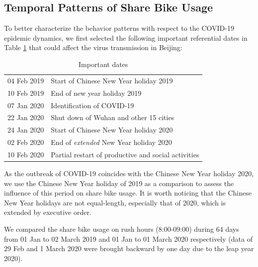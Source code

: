 \documentclass[ijgi,submit,moreauthors,pdftex]{Definitions/mdpi}
\begin{document}
\subsection{Temporal Patterns of Share Bike Usage}
To better characterize the behavior patterns with respect to the COVID-19 epidemic dynamics, we first selected the following important referential dates in Table \ref{tab:important_dates} that could affect the virus transmission in Beijing: 

\begin{table}[ht]
    \centering
    \begin{tabular}{ll}
    04 Feb 2019 & Start of Chinese New Year holiday 2019\\
    10 Feb 2019 & End of new year holiday 2019\\
    07 Jan 2020 & Identification of COVID-19\\
    22 Jan 2020 & Shut down of Wuhan and other 15 cities\\
    24 Jan 2020 & Start of Chinese New Year holiday 2020\\
    02 Feb 2020 & End of \textit{extended} New Year holiday 2020\\
    10 Feb 2020 & Partial restart of productive and social activities
    \end{tabular}
    \caption{Important dates}
    \label{tab:important_dates}
\end{table}

As the outbreak of COVID-19 coincides with the Chinese New Year holiday 2020, we use the Chinese New Year holiday of 2019 as a comparison to assess the influence of this period on share bike usage.
It is worth noticing that the Chinese New Year holidays are not equal-length, especially that of 2020, which is extended by executive order.

We compared the share bike usage on rush hours (8:00-09:00) during 64 days from 01 Jan to 02 March 2019 and 01 Jan to 01 March 2020 respectively (data of 29 Feb and 1 March 2020 were brought backward by one day due to the leap year 2020).

\end{document}
